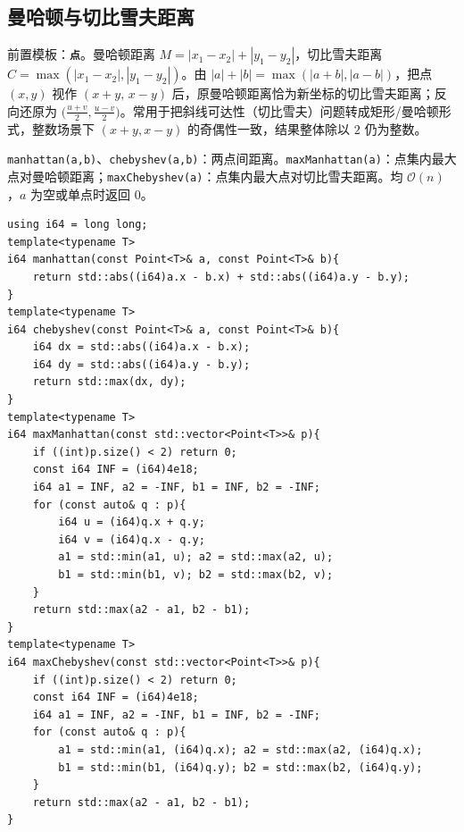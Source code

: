 \subsection{曼哈顿与切比雪夫距离}

前置模板：\textbf{\texttt{点}}。曼哈顿距离 $M=|x_1-x_2|+|y_1-y_2|$，切比雪夫距离 $C=\max(|x_1-x_2|,|y_1-y_2|)$。由 $|a|+|b|=\max(|a+b|,|a-b|)$，把点 $(x,y)$ 视作 $(x+y,\,x-y)$ 后，原曼哈顿距离恰为新坐标的切比雪夫距离；反向还原为 $\bigl(\tfrac{u+v}{2},\tfrac{u-v}{2}\bigr)$。常用于把斜线可达性（切比雪夫）问题转成矩形/曼哈顿形式，整数场景下 $(x+y,x-y)$ 的奇偶性一致，结果整体除以 $2$ 仍为整数。

\verb|manhattan(a,b)|、\verb|chebyshev(a,b)|：两点间距离。\verb|maxManhattan(a)|：点集内最大点对曼哈顿距离；\verb|maxChebyshev(a)|：点集内最大点对切比雪夫距离。均 $\mathcal{O}(n)$，$a$ 为空或单点时返回 $0$。

\begin{lstlisting}
using i64 = long long;
template<typename T>
i64 manhattan(const Point<T>& a, const Point<T>& b){
    return std::abs((i64)a.x - b.x) + std::abs((i64)a.y - b.y);
}
template<typename T>
i64 chebyshev(const Point<T>& a, const Point<T>& b){
    i64 dx = std::abs((i64)a.x - b.x);
    i64 dy = std::abs((i64)a.y - b.y);
    return std::max(dx, dy);
}
template<typename T>
i64 maxManhattan(const std::vector<Point<T>>& p){
    if ((int)p.size() < 2) return 0;
    const i64 INF = (i64)4e18;
    i64 a1 = INF, a2 = -INF, b1 = INF, b2 = -INF;
    for (const auto& q : p){
        i64 u = (i64)q.x + q.y;
        i64 v = (i64)q.x - q.y;
        a1 = std::min(a1, u); a2 = std::max(a2, u);
        b1 = std::min(b1, v); b2 = std::max(b2, v);
    }
    return std::max(a2 - a1, b2 - b1);
}
template<typename T>
i64 maxChebyshev(const std::vector<Point<T>>& p){
    if ((int)p.size() < 2) return 0;
    const i64 INF = (i64)4e18;
    i64 a1 = INF, a2 = -INF, b1 = INF, b2 = -INF;
    for (const auto& q : p){
        a1 = std::min(a1, (i64)q.x); a2 = std::max(a2, (i64)q.x);
        b1 = std::min(b1, (i64)q.y); b2 = std::max(b2, (i64)q.y);
    }
    return std::max(a2 - a1, b2 - b1);
}
\end{lstlisting}
